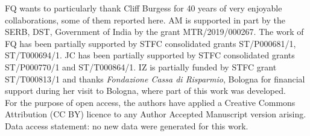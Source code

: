 FQ wants to particularly thank Cliff Burgess for 40 years of very enjoyable collaborations, some of them reported here.
 AM is supported in part by the SERB, DST, Government of India by the grant MTR/2019/000267.
 The work of FQ has been partially supported by STFC consolidated grants ST/P000681/1, ST/T000694/1. JC has been partially supported by STFC consolidated grants ST/P000770/1 and ST/T000864/1.
IZ is partially funded by STFC grant ST/T000813/1 and thanks {\em Fondazione Cassa di Risparmio}, Bologna for financial support during her visit to Bologna, where part of this work was developed.\\

For the purpose of open access,
the authors have applied a Creative Commons Attribution (CC BY) licence to any Author Accepted Manuscript version arising. Data access statement: no new data were generated for this work.

 
 \newpage
 
 
 
 
 
 
 
 
 
 
 
 